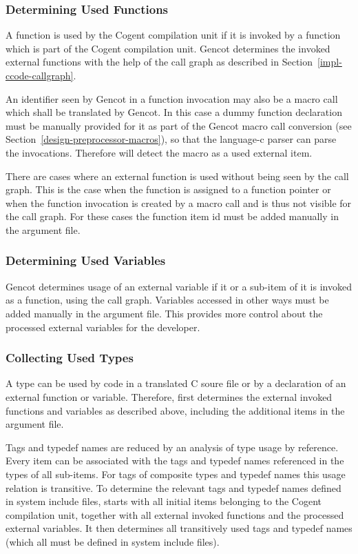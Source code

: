 \subsubsection{Determining Used Functions}

A function is used by the Cogent compilation unit if it is invoked by a function which is part of the Cogent compilation unit. 
Gencot determines the invoked external functions with the help of the call graph as described in 
Section~\ref{impl-ccode-callgraph}. 

An identifier seen by Gencot in a function invocation may also be a macro call which shall be translated by Gencot. 
In this case a dummy function declaration must be manually provided for it as part of the Gencot macro call conversion
(see Section~\ref{design-preprocessor-macros}), so that the language-c parser can parse the invocations. 
Therefore  will detect the macro as a used external item.

There are cases where an external function is used without being seen by the call graph. This is the case when
the function is assigned to a function pointer or when the function invocation is created by a macro call and
is thus not visible for the call graph. For these cases the function item id must be added manually in the argument file.

\subsubsection{Determining Used Variables}

Gencot determines usage of an external variable if it or a sub-item of it is invoked as a function, using the 
call graph. Variables accessed in other ways must be added manually in the argument file. This
provides more control about the processed external variables for the developer.

\subsubsection{Collecting Used Types}

A type can be used by code in a translated C soure file or by a declaration of an external function or variable.
Therefore,  first determines the external invoked functions and variables as described above, including
the additional items in the argument file.

Tags and typedef names are reduced by an analysis of type usage by reference. Every item can be
associated with the tags and typedef names referenced in the types of all sub-items. For tags of 
composite types and typedef names this usage relation is transitive. To determine the relevant tags 
and typedef names defined in system include files,  starts with all initial items belonging
to the Cogent compilation unit, together with all external invoked functions and the processed external variables. 
It then determines all transitively used tags and typedef names (which all must be defined in system include files).

